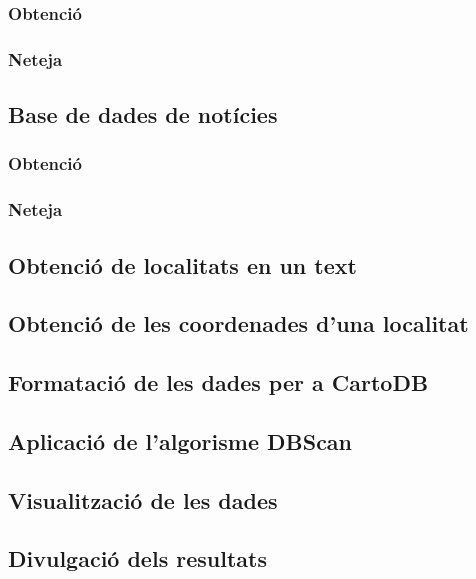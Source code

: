 \documentclass[12pt,a4paper,openright,oneside]{article}
\numberwithin{equation}{section}
\theoremstyle{definition}
\begin{document}
\subsubsection*{Obtenció}

\subsubsection*{Neteja}

\subsection*{Base de dades de notícies}

\subsubsection*{Obtenció}

\subsubsection*{Neteja}

\subsection{Obtenció de localitats en un text}

\subsection{Obtenció de les coordenades d'una localitat}

\subsection{Formatació de les dades per a CartoDB}

\subsection{Aplicació de l'algorisme DBScan}

\subsection{Visualització de les dades}

\subsection{Divulgació dels resultats}
\end{document}
